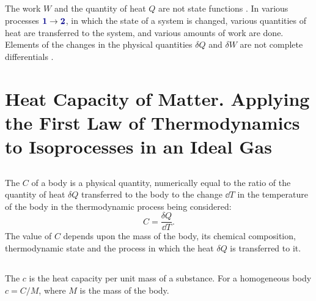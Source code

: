 \subsection{}\label{9.4.3} The work $W$ and the quantity of heat $Q$ are not state functions . In various processes $\hlblue{1} \to \hlblue{2}$, in which the state of a system is changed, various quantities of heat are transferred to the system, and various amounts of work are done. Elements of the changes in the physical quantities $\delta Q$ and $\delta W$ are not complete differentials .

\section[Heat Capacity of Matter]{Heat Capacity of Matter. Applying the First Law of Thermodynamics to Isoprocesses in an Ideal Gas}
\label{sec-9.5}

\subsection{}\label{9.5.1} The  $C$ of a body is a physical quantity, numerically equal to the ratio of the quantity of heat $\delta Q$ transferred to the body to the change $\dd T$ in the temperature of the body in the thermodynamic process being considered:
\begin{equation*}%
C = \frac{\delta Q}{\dd T}.
\end{equation*}
The value of $C$ depends upon the mass of the body, its chemical composition, thermodynamic state and the process in which the heat $\delta Q$ is transferred to it.

\subsection{}\label{9.5.2} The  $c$ is the heat capacity per unit mass of a substance. For a homogeneous body $c = C/M$, where $M$ is the mass of the body.

